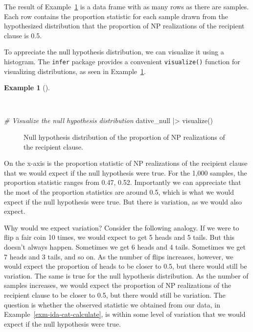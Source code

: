 \documentclass[
  letterpaper,
  DIV=11,
  numbers=noendperiod]{scrreprt}
\newenvironment{Shaded}{\begin{snugshade}}{\end{snugshade}}
\newcommand{\CommentTok}[1]{\textcolor[rgb]{0.00,0.00,0.00}{\textit{#1}}}
\newcommand{\FunctionTok}[1]{\textcolor[rgb]{0.00,0.00,0.00}{#1}}
\newcommand{\NormalTok}[1]{\textcolor[rgb]{0.00,0.00,0.00}{#1}}
\newcommand{\SpecialCharTok}[1]{\textcolor[rgb]{0.00,0.00,0.00}{#1}}
\theoremstyle{definition}
\newtheorem{example}{Example}[chapter]
\theoremstyle{remark}
\begin{document}
The result of Example~\ref{exm-ida-cat-null-hypothesis} is a data frame
with as many rows as there are samples. Each row contains the proportion
statistic for each sample drawn from the hypothesized distribution that
the proportion of NP realizations of the recipient clause is 0.5.

To appreciate the null hypothesis distribution, we can visualize it
using a histogram. The \texttt{infer} package provides a convenient
\texttt{visualize()} function for visualizing distributions, as seen in
Example~\ref{exm-ida-cat-null-hypothesis}.

\begin{example}[]\protect\hypertarget{exm-ida-cat-null-hypothesis}{}\label{exm-ida-cat-null-hypothesis}

~

\begin{Shaded}
\begin{Highlighting}[]
\CommentTok{\# Visualize the null hypothesis distribution}
\NormalTok{dative\_null }\SpecialCharTok{|\textgreater{}}
  \FunctionTok{visualize}\NormalTok{()}
\end{Highlighting}
\end{Shaded}

\begin{figure}[H]


\caption{\label{fig-ida-cat-null-hypothesis}Null hypothesis distribution
of the proportion of NP realizations of the recipient clause.}

\end{figure}%

\end{example}

On the x-axis is the proportion statistic of NP realizations of the
recipient clause that we would expect if the null hypothesis were true.
For the 1,000 samples, the proportion statistic ranges from 0.47, 0.52.
Importantly we can appreciate that the most of the proportion statistics
are around 0.5, which is what we would expect if the null hypothesis
were true. But there is variation, as we would also expect.

Why would we expect variation? Consider the following analogy. If we
were to flip a fair coin 10 times, we would expect to get 5 heads and 5
tails. But this doesn't always happen. Sometimes we get 6 heads and 4
tails. Sometimes we get 7 heads and 3 tails, and so on. As the number of
flips increases, however, we would expect the proportion of heads to be
closer to 0.5, but there would still be variation. The same is true for
the null hypothesis distribution. As the number of samples increases, we
would expect the proportion of NP realizations of the recipient clause
to be closer to 0.5, but there would still be variation. The question is
whether the observed statistic we obtained from our data, in
Example~\ref{exm-ida-cat-calculate}, is within some level of variation
that we would expect if the null hypothesis were true.
\end{document}
